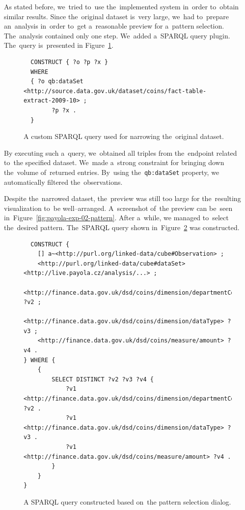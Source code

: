 As stated before, we~tried to~use the~implemented system in~order to~obtain 
similar results. Since the~original dataset is~very large, we~had to~prepare an~analysis in~order to~get a~reasonable preview for a~pattern selection. The~analysis contained only one step. We~added a~SPARQL query plugin. The~query is~presented
in Figure~\ref{fig:coins-query-narrow}.

\begin{figure}
  \scriptsize
\begin{verbatim}
  CONSTRUCT { ?o ?p ?x }
  WHERE
  { ?o qb:dataSet <http://source.data.gov.uk/dataset/coins/fact-table-extract-2009-10> ;
        ?p ?x .
  }
\end{verbatim}
\caption{A custom SPARQL query used for narrowing the~original dataset.}
\label{fig:coins-query-narrow}
\end{figure}

By executing such a~query, we~obtained all triples from the~endpoint 
related to~the specified dataset. We~made a~strong constraint for bringing 
down the~volume of~returned entries. By~using the~\texttt{qb:dataSet} property, 
we automatically filtered the~observations.

Despite the~narrowed dataset, the~preview was still too large 
for the~resulting visualization to~be well--arranged. A~screenshot of~the 
preview can be~seen in~Figure~\ref{fig:payola-exp-02-pattern}. After a~while,
we managed to~select the~desired 
pattern. The~SPARQL query shown in~Figure~\ref{fig:coins-pattern-result} was 
constructed.

\begin{figure}
  \scriptsize
\begin{verbatim}
  CONSTRUCT {
    [] a~<http://purl.org/linked-data/cube#Observation> ;
    <http://purl.org/linked-data/cube#dataSet> <http://live.payola.cz/analysis/...> ;
    <http://finance.data.gov.uk/dsd/coins/dimension/departmentCode> ?v2 ;
    <http://finance.data.gov.uk/dsd/coins/dimension/dataType> ?v3 ;
    <http://finance.data.gov.uk/dsd/coins/measure/amount> ?v4 .
} WHERE {
    {
        SELECT DISTINCT ?v2 ?v3 ?v4 {
            ?v1 <http://finance.data.gov.uk/dsd/coins/dimension/departmentCode> ?v2 .
            ?v1 <http://finance.data.gov.uk/dsd/coins/dimension/dataType> ?v3 .
            ?v1 <http://finance.data.gov.uk/dsd/coins/measure/amount> ?v4 .
        }
    }
} 
\end{verbatim}
\caption{A SPARQL query constructed based on~the pattern selection dialog.}
\label{fig:coins-pattern-result}
\end{figure}

